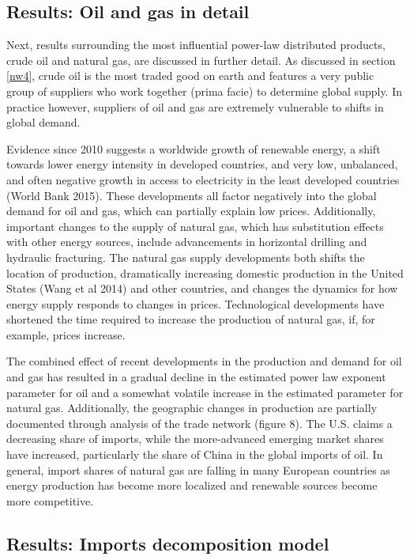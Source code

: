 \documentclass[10pt,letterpaper,pdftex]{article}
\begin{document}
\subsection{Results: Oil and gas in detail} \label{results_oil_gas_detail}
Next, results surrounding the most influential power-law distributed products, crude oil and natural gas, are discussed in further detail. As discussed in section \ref{nw4}, crude oil is the most traded good on earth and features a very public group of suppliers who work together (prima facie) to determine global supply. In practice however, suppliers of oil and gas are extremely vulnerable to shifts in global demand. 

Evidence since 2010 suggests a worldwide growth of renewable energy, a shift towards lower energy intensity in developed countries, and very low, unbalanced, and often negative growth in access to electricity in the least developed countries (World Bank 2015). These developments all factor negatively into the global demand for oil and gas, which can partially explain low prices. Additionally, important changes to the supply of natural gas, which has substitution effects with other energy sources, include advancements in horizontal drilling and hydraulic fracturing. The natural gas supply developments both shifts the location of production, dramatically increasing domestic production in the United States (Wang et al 2014) and other countries, and changes the dynamics for how energy supply responds to changes in prices. Technological developments have shortened the time required to increase the production of natural gas, if, for example, prices increase.

The combined effect of recent developments in the production and demand for oil and gas has resulted in a gradual decline in the estimated power law exponent parameter for oil and a somewhat volatile increase in the estimated parameter for natural gas. Additionally, the geographic changes in production are partially documented through analysis of the trade network (figure 8). The U.S. claims a decreasing share of imports, while the more-advanced emerging market shares have increased, particularly the share of China in the global imports of oil. In general, import shares of natural gas are falling in many European countries as energy production has become more localized and renewable sources become more competitive.

\subsection{Results: Imports decomposition model} \label{results_mdecomp}
\end{document}
